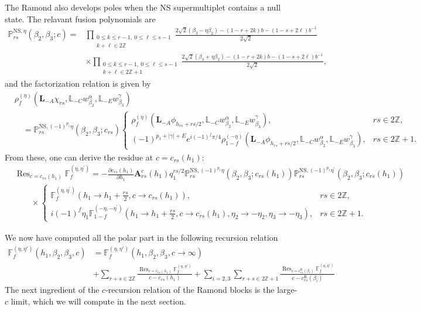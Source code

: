 \documentclass[12pt]{article}
\newcommand{\ie}{\begin{equation}\begin{aligned}}
\newcommand{\fe}{\end{aligned}\end{equation}}
\numberwithin{equation}{section}
\newcommand{\R}{\mathrm{R}}
\newcommand{\NS}{\mathrm{NS}}
\begin{document}
The Ramond also develops poles when the NS supermultiplet contains a null state. The relavant fusion polynomials are
\ie
\mathbb{P}_{rs}^{\NS,\eta}(\beta_2,\beta_3;c)
={}&
\prod_{\substack{0\le k\le r-1,\ 0\le\ell\le s-1\\k+\ell\in2\mathbb Z}}
\frac{2\sqrt2(\beta_3-\eta\beta_2)
 -(1-r+2k)b-(1-s+2\ell)b^{-1}}{2\sqrt2}\\
&\times
\prod_{\substack{0\le k\le r-1,\ 0\le\ell\le s-1\\k+\ell\in2\mathbb Z+1}}
\frac{2\sqrt2(\beta_3+\eta\beta_2)
 -(1-r+2k)b-(1-s+2\ell)b^{-1}}{2\sqrt2},
\label{eq:appendix-ns-rr-fusion-polynomial}
\fe
and the factorization relation is given by
\ie
&\rho_f^{(\eta)}
 (\mathbf{L}_{-A}\chi_{rs},
  \mathbb{L}_{-C}w_{\beta_2}^{\alpha},
  \mathbb{L}_{-E}w_{\beta_3}^{\gamma})\\
&\quad=
\mathbb{P}_{rs}^{\NS,(-1)^{p_1}\eta}(\beta_2,\beta_3;c_{rs})\begin{cases}
\rho_f^{(\eta)}
 (\mathbf{L}_{-A}\phi_{h_{rs}+rs/2},
  \mathbb{L}_{-C}w_{\beta_2}^{\alpha},
  \mathbb{L}_{-E}w_{\beta_3}^{\gamma}),&rs\in2\mathbb Z,\\[0.4em]
(-1)^{p_1+|\gamma|+E}e^{i(-1)^f\pi/4}\rho_{1-f}^{(-\eta)}
 (\mathbf{L}_{-A}\phi_{h_{rs}+rs/2},
  \mathbb{L}_{-C}w_{\beta_2}^{\alpha},
  \mathbb{L}_{-E}w_{\beta_3}^{\gamma}),&rs\in2\mathbb Z+1.
\end{cases}
\fe
From these, one can derive the residue at $c=c_{rs}(h_1)$:
\ie
&\operatorname{Res}_{c=c_{r s}\left(h_1\right)} \mathbb{F}_f^{\left(\eta, \eta^{\prime}\right)} = -\frac{\partial c_{r s}\left(h_1\right)}{\partial h_1} \mathbf{A}_{r s}^c(h_1) q_1^{r s / 2} \mathbb{P}_{r s}^{\mathrm{NS}, (-1)^{p_1}\eta}\left(\beta_2, \beta_3 ; c_{r s}(h_1)\right) \mathbb{P}_{r s}^{\mathrm{NS}, (-1)^{p_1}\eta^{\prime}}\left(\beta_2, \beta_3 ; c_{r s}(h_1)\right) \\
&\qquad \times \begin{cases}
\mathbb{F}_f^{\left(\eta, \eta^{\prime}\right)}\left(h_1\rightarrow h_1+ \tfrac{rs}{2}, c\rightarrow c_{r s}(h_1)\right),  & rs\in 2\mathbb{Z}, \\
i(-1)^f \eta_1 \mathbb{F}_{1-f}^{\left(-\eta, -\eta^{\prime}\right)}\left(h_1\rightarrow h_1+ \tfrac{rs}{2}, c\rightarrow c_{r s}(h_1),\eta_2\rightarrow -\eta_2, \eta_3\rightarrow -\eta_3\right), & rs\in 2\mathbb{Z}+1.
\end{cases}
\fe

We now have computed all the polar part in the following recursion relation
\ie
\mathbb{F}^{(\eta, \eta')}_f(h_1, \beta_2, \beta_3, c) &= \mathbb{F}^{(\eta, \eta')}_f(h_1, \beta_2, \beta_3, c\rightarrow \infty)\\
&+ \sum_{r+s\in 2\mathbb{Z}} \frac{\operatorname{Res}_{c=c_{rs}(h_1)}\mathbb{F}^{(\eta, \eta')}_f}{c-c_{rs}(h_1)} + \sum_{i=2,3}\sum_{r+s\in 2\mathbb{Z}+1} \frac{\operatorname{Res}_{c=c_{rs}^{\R}(\beta_i)} \mathbb{F}_f^{(\eta, \eta')}}{c-c_{rs}^{\R}(\beta_i)}
\fe
The next ingredient of the $c$-recursion relation of the Ramond blocks is the large-$c$ limit, which we will compute in the next section.
\end{document}
